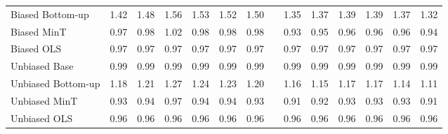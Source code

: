 \documentclass[12pt]{article}
\begin{document}
\begin{table}[htbp]
\begin{tabular}{lrrrrrrrrrrrrr}
    Biased Bottom-up        & 1.42  & 1.48  & 1.56  & 1.53  & 1.52  & 1.50  &       & 1.35  & 1.37  & 1.39  & 1.39  & 1.37  & 1.32 \\
    Biased MinT             & 0.97  & 0.98  & 1.02  & 0.98  & 0.98  & 0.98  &       & 0.93  & 0.95  & 0.96  & 0.96  & 0.96  & 0.94 \\
    Biased OLS              & 0.97  & 0.97  & 0.97  & 0.97  & 0.97  & 0.97  &       & 0.97  & 0.97  & 0.97  & 0.97  & 0.97  & 0.97 \\
    Unbiased Base           & 0.99  & 0.99  & 0.99  & 0.99  & 0.99  & 0.99  &       & 0.99  & 0.99  & 0.99  & 0.99  & 0.99  & 0.99 \\
    Unbiased Bottom-up      & 1.18  & 1.21  & 1.27  & 1.24  & 1.23  & 1.20  &       & 1.16  & 1.15  & 1.17  & 1.17  & 1.14  & 1.11 \\
    Unbiased MinT           & 0.93  & 0.94  & 0.97  & 0.94  & 0.94  & 0.93  &       & 0.91  & 0.92  & 0.93  & 0.93  & 0.93  & 0.91 \\
    Unbiased OLS            & 0.96  & 0.96  & 0.96  & 0.96  & 0.96  & 0.96  &       & 0.96  & 0.96  & 0.96  & 0.96  & 0.96  & 0.96 \\\bottomrule
    \end{tabular}
  \label{tab:bias}%
\end{table}%
\end{document}
